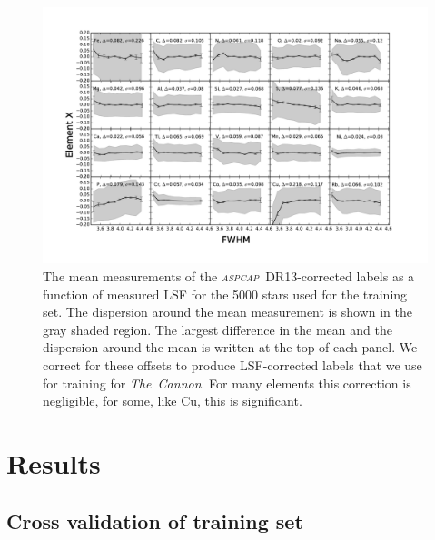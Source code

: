 \documentclass[14pt, preprint2]{aastex6}
\newcommand{\project}[1]{\textsl{#1}}
\newcommand{\tc}{\project{The~Cannon}}
\newcommand{\aspcap}{\project{\textsc{aspcap}}}
\begin{document}
\begin{figure}[h!]
\includegraphics[scale=0.6]{training_input.pdf} 
  \caption{The mean measurements of the \aspcap\ DR13-corrected labels as a function of measured LSF for the 5000 stars used for the training set. The dispersion around the mean measurement is shown in the gray shaded region. The largest difference in the mean and the dispersion around the mean is written at the top of each panel. We correct for these offsets to produce LSF-corrected labels that we use for training for \tc. For many elements this correction is negligible, for some, like Cu, this is significant.  }
\label{fig:training}
\end{figure}



\section{Results}

\subsection{Cross validation of training set} 
\end{document}
